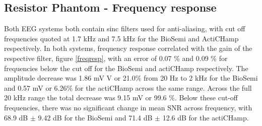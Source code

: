 \subsection{Resistor Phantom - Frequency response}
Both EEG systems both contain sinc filters used for anti-aliasing, with cut off frequencies quoted at 1.7 kHz and 7.5 kHz for the BioSemi and ActiCHamp respectively. In both systems, frequency response correlated with the gain of the respective filter, figure \ref{freqresp}, with an error of 0.07 \% and 0.09 \% for frequencies below the cut off for the BioSemi and actiCHamp respectively. The amplitude decrease was 1.86 mV V or 21.0\% from 20 Hz to 2 kHz for the BioSemi and 0.57 mV or 6.26\% for the actiCHamp across the same range. Across the full 20 kHz range the total decrease was 9.15 mV or  99.6 \%. Below these cut-off frequencies, there was no significant change in mean SNR across frequency, with 68.9 dB $\pm$ 9.42 dB for the BioSemi and 71.4 dB $\pm$ 12.6 dB for the actiCHamp.  
